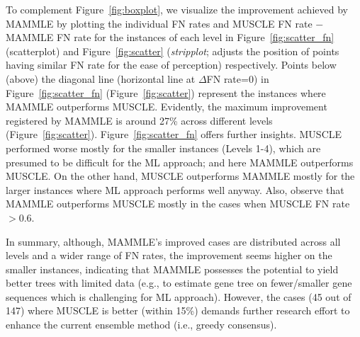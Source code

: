 To complement Figure~\ref{fig:boxplot}, we visualize the improvement achieved by MAMMLE by plotting the individual FN rates and MUSCLE FN rate $-$ MAMMLE FN rate for the instances of each level in Figure~\ref{fig:scatter_fn} (scatterplot) and Figure~\ref{fig:scatter} (\textit{stripplot}; adjusts the position of points having similar FN rate for the ease of perception) respectively. Points below (above) the diagonal line (horizontal line at $\Delta$FN rate=0) in Figure~\ref{fig:scatter_fn} (Figure~\ref{fig:scatter}) represent the instances where MAMMLE outperforms MUSCLE. Evidently, the maximum improvement registered by MAMMLE is around 27\% across different levels (Figure~\ref{fig:scatter}). Figure~\ref{fig:scatter_fn} offers further insights. MUSCLE performed worse mostly for the smaller instances (Levels 1-4), which are presumed to be difficult for the ML approach; and here MAMMLE outperforms MUSCLE. On the other hand, MUSCLE outperforms MAMMLE mostly for the larger instances where ML approach performs well anyway. Also, observe that MAMMLE outperforms MUSCLE mostly in the cases when MUSCLE FN rate $> 0.6$. 

In summary, although, MAMMLE's improved cases are distributed across all levels and a wider range of FN rates, the improvement seems higher on the smaller instances, indicating that MAMMLE possesses the potential to yield better trees with limited data (e.g., to estimate gene tree on fewer/smaller gene sequences which is challenging for ML approach). 
However, the cases (45 out of 147) where MUSCLE is better (within 15\%) demands further research effort to enhance the current ensemble method (i.e., greedy consensus).


